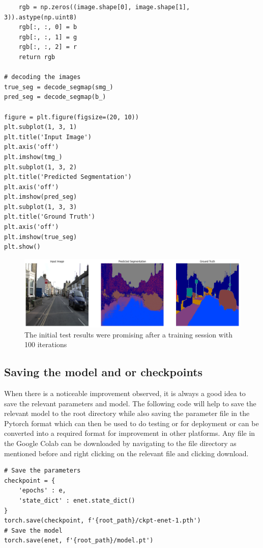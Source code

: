 \begin{enumerate}
\begin{lstlisting}
    rgb = np.zeros((image.shape[0], image.shape[1], 3)).astype(np.uint8)
    rgb[:, :, 0] = b
    rgb[:, :, 1] = g
    rgb[:, :, 2] = r
    return rgb

# decoding the images
true_seg = decode_segmap(smg_)
pred_seg = decode_segmap(b_)

figure = plt.figure(figsize=(20, 10))
plt.subplot(1, 3, 1)
plt.title('Input Image')
plt.axis('off')
plt.imshow(tmg_)
plt.subplot(1, 3, 2)
plt.title('Predicted Segmentation')
plt.axis('off')
plt.imshow(pred_seg)
plt.subplot(1, 3, 3)
plt.title('Ground Truth')
plt.axis('off')
plt.imshow(true_seg)
plt.show()
\end{lstlisting}
	      \begin{figure}[H]
		      \centering
		      \includegraphics[width=450pt]{assets/enet/camvid/out1.png}
		      \caption{The initial test results were promising after a training session with 100 iterations}
		      \label{fig:using:test4}
	      \end{figure}
\end{enumerate}



\subsection*{Saving the model and or checkpoints}
When there is a noticeable improvement observed, it is always a good idea to save the relevant parameters and model. The following code will help to save the relevant model to the root directory while also saving the parameter file in the Pytorch format which can then be used to do testing or for deployment or can be converted into a required format for improvement in other platforms. Any file in the Google Colab can be downloaded by navigating to the file directory as mentioned before and right clicking on the relevant file and clicking download.
\begin{lstlisting}
# Save the parameters
checkpoint = {
    'epochs' : e,
    'state_dict' : enet.state_dict()
}
torch.save(checkpoint, f'{root_path}/ckpt-enet-1.pth')
# Save the model
torch.save(enet, f'{root_path}/model.pt')
\end{lstlisting}

